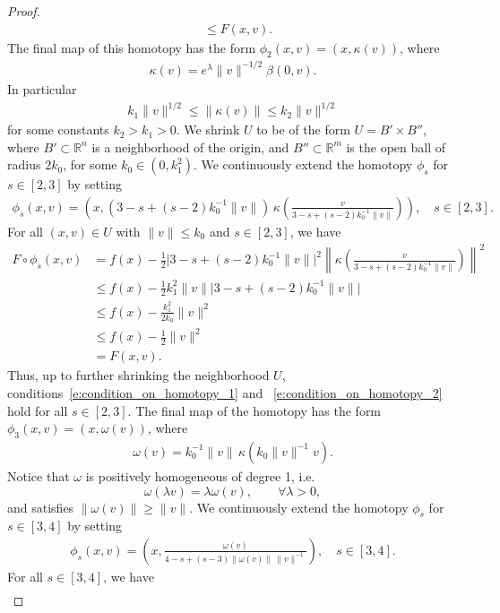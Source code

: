 \documentclass[reqno]{amsart}
\numberwithin{equation}{section}
\theoremstyle{personal}%
\theoremstyle{definition}
\newcommand{\R}{\mathds{R}}
\begin{document}
\begin{proof}
\begin{align*}
& \leq F(x,v).
\end{align*}
The final map of this homotopy has the form $\phi_2(x,v)=(x,\kappa(v))$, where 
\begin{align*}
\kappa(v)=e^\lambda \|v\|^{-1/2} \beta(0,v).
\end{align*}
In particular
\begin{align*}
k_1\|v\|^{1/2} \leq \|\kappa(v)\|\leq k_2\|v\|^{1/2}
\end{align*}
for some constants $k_2>k_1>0$. We shrink $U$ to be of the form $U=B'\times B''$, where $B'\subset\R^n$ is a neighborhood of the origin, and $B''\subset\R^m$ is the open ball of radius $2k_0$, for some $k_0\in(0,k_1^2)$. We continuously extend the homotopy $\phi_s$ for $s\in[2,3]$ by setting
\begin{align*}
\phi_s(x,v)
=
\left( x , (3-s+(s-2) k_0^{-1}\|v\|)\, \kappa\left( \frac{v}{3-s+(s-2) k_0^{-1}\|v\|}\right) \right)\!,
\quad
s\in[2,3].
\end{align*}
For all $(x,v)\in U$ with $\|v\|\leq k_0$ and $s\in[2,3]$, we have
\begin{align*}
F\circ\phi_s(x,v)
&=
f(x)
-\frac{1}{2} \Big|3-s+(s-2) k_0^{-1}\|v\|\Big|^2 \left\|
\kappa\left( 
\frac{v}{3-s+(s-2) k_0^{-1}\|v\|}\right) 
\right\|^2\\
&\leq
f(x)
-\frac{1}{2} k_1^2 \|v\| \Big|3-s+(s-2) k_0^{-1}\|v\|\Big|\\
&\leq
f(x)
-\frac{k_1^2}{2k_0}  \|v\|^2 \\
&\leq
f(x)
-\frac{1}{2}  \|v\|^2 \\
&=
F(x,v).
\end{align*}
Thus, up to further shrinking the neighborhood $U$, conditions~\eqref{e:condition_on_homotopy_1} and ~\eqref{e:condition_on_homotopy_2} hold for all $s\in[2,3]$. The final map of the homotopy has the form $\phi_3(x,v)=(x,\omega(v))$, where 
\begin{align*}
 \omega(v) = k_0^{-1} \|v\|\, \kappa( k_0 \|v\|^{-1}v ).
\end{align*}
Notice that $\omega$ is positively homogeneous of degree 1, i.e. 
\[\omega(\lambda v)=\lambda\omega(v),
\qquad\forall \lambda >0,\]
and satisfies $\|\omega(v)\|\geq\|v\|$. We continuously extend the homotopy $\phi_s$ for $s\in[3,4]$ by setting
\begin{align*}
\phi_s(x,v)
=
\left( x , \frac{\omega(v)}{4-s+(s-3)\|\omega(v)\|\,\|v\|^{-1}}\right)\!,
\quad
s\in[3,4].
\end{align*}
For all $s\in[3,4]$, we have
\begin{align*}

\end{align*}
\end{proof}
\end{document}

